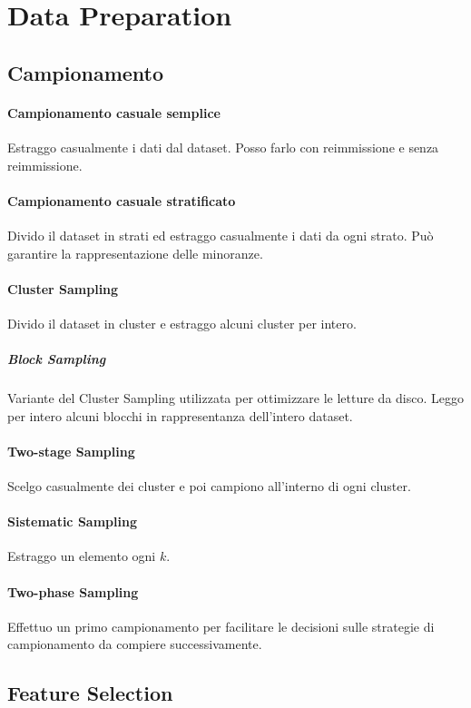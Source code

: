 \documentclass[11pt,onecolumn,a4paper,oneside]{book}
\begin{document}
		
	\section{Data Preparation}
		\subsection{Campionamento}
\paragraph{Campionamento casuale semplice} Estraggo casualmente i dati dal dataset. Posso farlo con reimmissione e senza reimmissione.

\paragraph{Campionamento casuale stratificato}

Divido il dataset in strati ed estraggo casualmente i dati da ogni strato. Può garantire la rappresentazione delle minoranze.

\paragraph{Cluster Sampling}
Divido il dataset in cluster e estraggo alcuni cluster per intero.
\subparagraph{Block Sampling}
Variante del Cluster Sampling utilizzata per ottimizzare le letture da disco. Leggo per intero alcuni blocchi in rappresentanza dell'intero dataset.

\paragraph{Two-stage Sampling}
Scelgo casualmente dei cluster e poi campiono all'interno di ogni cluster.

\paragraph{Sistematic Sampling}
Estraggo un elemento ogni $k$.


\paragraph{Two-phase Sampling}		
Effettuo un primo campionamento per facilitare le decisioni sulle strategie di campionamento da compiere successivamente.

		\subsection{Feature Selection}
\end{document}
